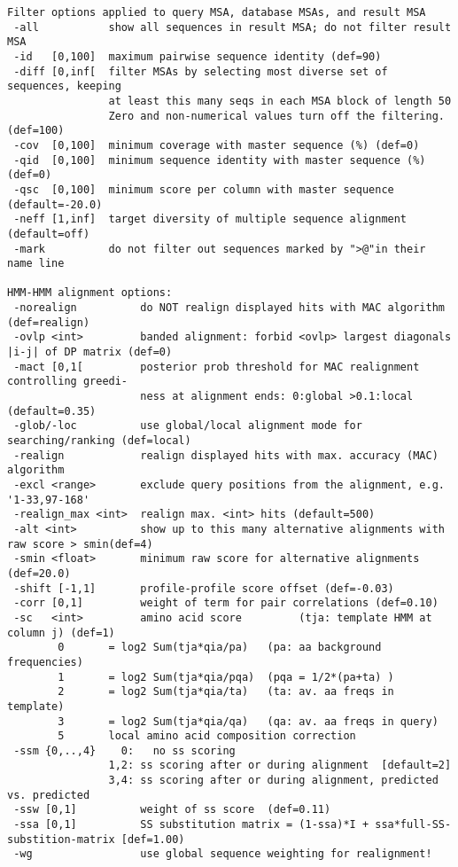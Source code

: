 \documentclass[11pt,a4paper]{article}
\begin{document}
\begin{verbatim}
Filter options applied to query MSA, database MSAs, and result MSA              
 -all           show all sequences in result MSA; do not filter result MSA      
 -id   [0,100]  maximum pairwise sequence identity (def=90)
 -diff [0,inf[  filter MSAs by selecting most diverse set of sequences, keeping 
                at least this many seqs in each MSA block of length 50 
                Zero and non-numerical values turn off the filtering. (def=100) 
 -cov  [0,100]  minimum coverage with master sequence (%) (def=0)             
 -qid  [0,100]  minimum sequence identity with master sequence (%) (def=0)    
 -qsc  [0,100]  minimum score per column with master sequence (default=-20.0)    
 -neff [1,inf]  target diversity of multiple sequence alignment (default=off)   
 -mark          do not filter out sequences marked by ">@"in their name line  

HMM-HMM alignment options:                                                       
 -norealign          do NOT realign displayed hits with MAC algorithm (def=realign)   
 -ovlp <int>         banded alignment: forbid <ovlp> largest diagonals |i-j| of DP matrix (def=0)
 -mact [0,1[         posterior prob threshold for MAC realignment controlling greedi- 
                     ness at alignment ends: 0:global >0.1:local (default=0.35)       
 -glob/-loc          use global/local alignment mode for searching/ranking (def=local)
 -realign            realign displayed hits with max. accuracy (MAC) algorithm 
 -excl <range>       exclude query positions from the alignment, e.g. '1-33,97-168' 
 -realign_max <int>  realign max. <int> hits (default=500)                        
 -alt <int>          show up to this many alternative alignments with raw score > smin(def=4)  
 -smin <float>       minimum raw score for alternative alignments (def=20.0)  
 -shift [-1,1]       profile-profile score offset (def=-0.03)                         
 -corr [0,1]         weight of term for pair correlations (def=0.10)                
 -sc   <int>         amino acid score         (tja: template HMM at column j) (def=1)
        0       = log2 Sum(tja*qia/pa)   (pa: aa background frequencies)    
        1       = log2 Sum(tja*qia/pqa)  (pqa = 1/2*(pa+ta) )               
        2       = log2 Sum(tja*qia/ta)   (ta: av. aa freqs in template)     
        3       = log2 Sum(tja*qia/qa)   (qa: av. aa freqs in query)        
        5       local amino acid composition correction                     
 -ssm {0,..,4}    0:   no ss scoring                                             
                1,2: ss scoring after or during alignment  [default=2]         
                3,4: ss scoring after or during alignment, predicted vs. predicted
 -ssw [0,1]          weight of ss score  (def=0.11)                                  
 -ssa [0,1]          SS substitution matrix = (1-ssa)*I + ssa*full-SS-substition-matrix [def=1.00)
 -wg                 use global sequence weighting for realignment!                   


\end{verbatim}
\end{document}

